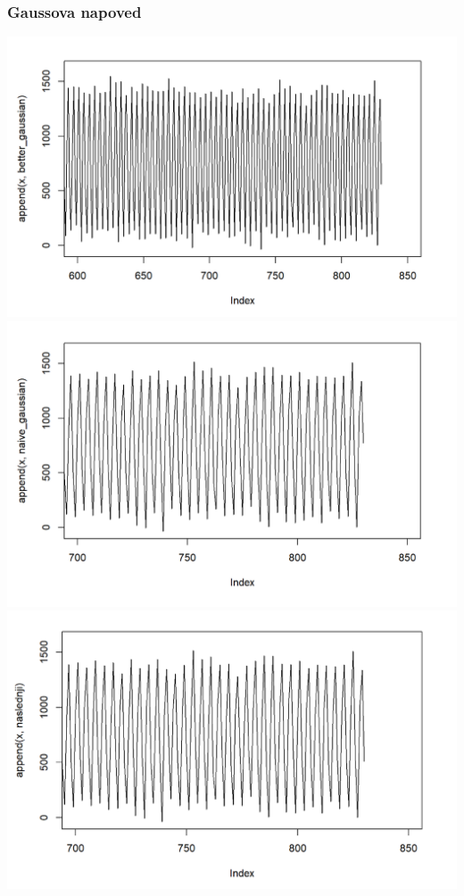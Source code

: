 \documentclass[10pt]{beamer}
\begin{document}
\begin{frame}
\frametitle{Gaussova napoved}
\includegraphics[width=1\textwidth]{betterA.png}
\includegraphics[width=1\textwidth]{naiveA.png}
\includegraphics[width=1\textwidth]{naslednjiA.png}
\end{frame}
\end{document}
